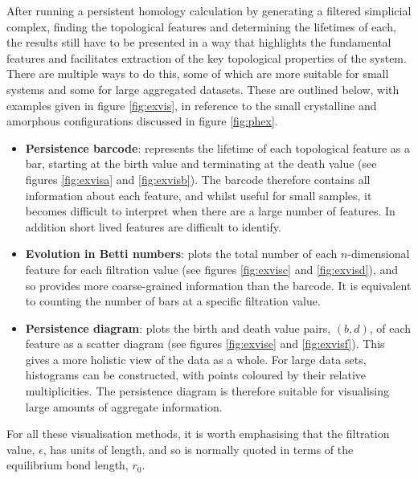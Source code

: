 After running a persistent homology calculation by generating a filtered simplicial complex, finding the topological features and determining the lifetimes of each, the results still have to be presented in a way that highlights the fundamental features and facilitates extraction of the key topological properties of the system.
There are multiple ways to do this, some of which are more suitable for small systems and some for large aggregated datasets.
These are outlined below, with examples given in figure \ref{fig:exvis}, in reference to the small crystalline and amorphous configurations discussed in figure \ref{fig:phex}.
\begin{itemize}
	\item \textbf{Persistence barcode}: represents the lifetime of each topological feature as a bar, starting at the birth value and terminating at the death value (see figures \ref{fig:exvisa} and \ref{fig:exvisb}). The barcode therefore contains all information about each feature, and whilst useful for small samples, it becomes difficult to interpret when there are a large number of features. In addition short lived features are difficult to identify.
	
	\item \textbf{Evolution in Betti numbers}: plots the total number of each $n$\--dimensional feature for each filtration value (see figures \ref{fig:exvisc} and \ref{fig:exvisd}), and so provides more coarse\--grained information than the barcode. It is equivalent to counting the number of bars at a specific filtration value.
	
	\item \textbf{Persistence diagram}: plots the birth and death value pairs, $\left(b,d\right)$, of each feature as a scatter diagram (see figures \ref{fig:exvise} and \ref{fig:exvisf}). This gives a more holistic view of the data as a whole. For large data sets, histograms can be constructed, with points coloured by their relative multiplicities. The persistence diagram is therefore suitable for visualising large amounts of aggregate information.
	
\end{itemize}
For all these visualisation methods, it is worth emphasising that the filtration value, $\epsilon$, has units of length, and so is normally quoted in terms of the equilibrium bond length, $r_0$. 

